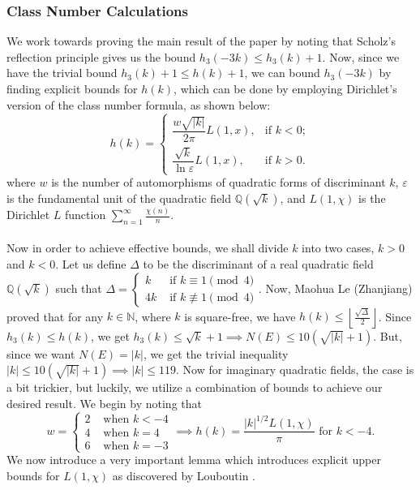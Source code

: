 \documentclass[12pt]{amsart}
\theoremstyle{plain}
\theoremstyle{definition}
\theoremstyle{remark}
\numberwithin{equation}{section}
\numberwithin{thm}{section}
\theoremstyle{named}
\theoremstyle{named}
\begin{document}
\subsubsection{{Class Number Calculations}}
We work towards proving the main result of the paper by noting that Scholz's reflection principle gives us the bound $h_3(-3k) \le h_3(k) + 1.$ Now, since we have the trivial bound $h_3(k) + 1 \le h(k) + 1$, we can bound $h_3(-3k)$ by finding explicit bounds for $h(k)$, which can be done by employing Dirichlet's version of the class number formula, as shown below: 
$$ h(k) = \begin{cases} 
\dfrac{w \sqrt{|k|}}{2\pi} L(1, x), & \text{if } k < 0; \\[1em] 
\dfrac{\sqrt{k}}{\ln \varepsilon} L(1, x), & \text{if } k > 0.
\end{cases} 
$$
where $w$ is the number of automorphisms of quadratic forms of discriminant $k$, $\varepsilon$ is the fundamental unit of the quadratic field $\mathbb{Q} (\sqrt{k})$, and $L(1, \chi)$ is the Dirichlet $L$ function $\sum_{n=1}^{\infty} \frac{\chi(n)}{n}$.
\\  \\ Now in order to achieve effective bounds, we shall divide $k$  into two cases, $k > 0 $ and $k < 0$. 
Let us define $\Delta$ to be the discriminant of a real quadratic field $\mathbb{Q}(\sqrt{k})$ such that $\Delta = \begin{cases} k & \text{ if } k \equiv 1 \pmod 4 \\ 4k & \text{ if } k \not\equiv 1 \pmod 4
    \end{cases}.$ Now, {Maohua Le (Zhanjiang)} \cite{Le1994} proved that for any $k \in \mathbb N$, where $k$ is square-free, we have $h(k) \le \left\lfloor \frac{\sqrt \Delta}{2} \right\rfloor$. Since $h_3(k) \le h(k)$, we get $h_3(k) \le \sqrt{k} + 1 \implies N(E) \le 10 (\sqrt{|k|} + 1).$ But, since we want $N(E) = |k|$, we get the trivial inequality $|k| \le 10 (\sqrt{|k|}  + 1) \implies |k| \le 119$. Now for imaginary quadratic fields, the case is a bit trickier, but luckily, we utilize a combination of bounds to achieve our desired result. We begin by noting that $$w = \begin{cases} 2 & \text{ when }k < -4 \\ 
    4 & \text{ when } k = 4 \\ 6 & \text{ when } k = -3\end{cases} \implies h(k) = \dfrac{|k|^{1/2} L(1, \chi)}{\pi} \text{ for } k < -4.$$ We now introduce  a very important lemma which introduces explicit upper bounds for $L(1, \chi)$ as discovered by Louboutin \cite{Stephane}. 
\end{document}
